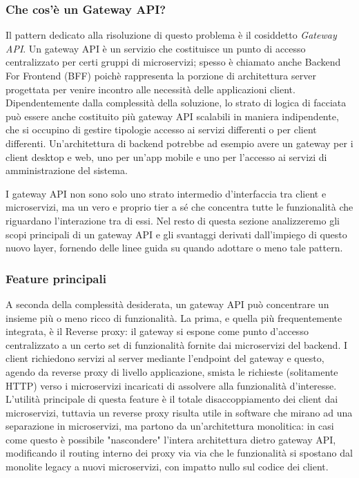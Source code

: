 \subsubsection{Che cos'è un Gateway API?}
Il pattern dedicato alla risoluzione di questo problema è il cosiddetto \emph{Gateway API}.
Un gateway API è un servizio che costituisce un punto di accesso centralizzato per certi gruppi di microservizi; spesso è chiamato anche Backend For Frontend (BFF) poichè rappresenta la porzione di architettura server progettata per venire incontro alle necessità delle applicazioni client.
Dipendentemente dalla complessità della soluzione, lo strato di logica di facciata può essere anche costituito più gateway API scalabili in maniera indipendente, che si occupino di gestire tipologie accesso ai servizi differenti o per client differenti. Un'architettura di backend potrebbe ad esempio avere un gateway per i client desktop e web, uno per un'app mobile e uno per l'accesso ai servizi di amministrazione del sistema.

I gateway API non sono solo uno strato intermedio d'interfaccia tra client e microservizi, ma un vero e proprio tier a sé che concentra tutte le funzionalità che riguardano l'interazione tra di essi. Nel resto di questa sezione analizzeremo gli scopi principali di un gateway API e gli svantaggi derivati dall'impiego di questo nuovo layer, fornendo delle linee guida su quando adottare o meno tale pattern.

\subsubsection{Feature principali}
A seconda della complessità desiderata, un gateway API può concentrare un insieme più o meno ricco di funzionalità.
La prima, e quella più frequentemente integrata, è il Reverse proxy: il gateway si espone come punto d'accesso centralizzato a un certo set di funzionalità fornite dai microservizi del backend. I client richiedono servizi al server mediante l'endpoint del gateway e questo, agendo da reverse proxy di livello applicazione, smista le richieste (solitamente HTTP) verso i microservizi incaricati di assolvere alla funzionalità d'interesse.
L'utilità principale di questa feature è il totale disaccoppiamento dei client dai microservizi, tuttavia un reverse proxy risulta utile in software che mirano ad una separazione in microservizi, ma partono da un'architettura monolitica: in casi come questo è possibile "nascondere" l'intera architettura dietro gateway API, modificando il routing interno dei proxy via via che le funzionalità si spostano dal monolite legacy a nuovi microservizi, con impatto nullo sul codice dei client.

